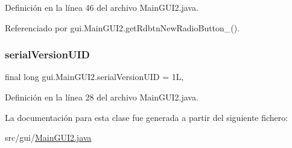 Definición en la línea 46 del archivo Main\+G\+U\+I2.\+java.



Referenciado por gui.\+Main\+G\+U\+I2.\+get\+Rdbtn\+New\+Radio\+Button\+\_().

\mbox{\label{classgui_1_1MainGUI2_a4f9e958204505c30484643bb4dc7a6b0}} 
\subsubsection{\texorpdfstring{serialVersionUID}{serialVersionUID}}
{\footnotesize\ttfamily final long gui.\+Main\+G\+U\+I2.\+serial\+Version\+U\+ID = 1L\hspace{0.3cm}{\ttfamily [static]}, {\ttfamily [private]}}



Definición en la línea 28 del archivo Main\+G\+U\+I2.\+java.



La documentación para esta clase fue generada a partir del siguiente fichero\+:\begin{DoxyCompactItemize}
\item 
src/gui/\mbox{\hyperlink{MainGUI2_8java}{Main\+G\+U\+I2.\+java}}\end{DoxyCompactItemize}
